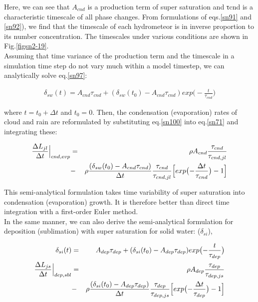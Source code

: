 Here, we can see that $A_{cnd}$ is a production term of super saturation and τcnd is a characteristic timescale of all phase changes. From formulations of eqs.\ref{sn91} and \ref{sn92}), we find that the timescale of each hydrometeor is in inverse proportion to its number concentration. The timescales under various conditions are shown in Fig.\ref{figsn2-19}.\\
Assuming that time variance of the production term and the timescale in a simulation time step do not vary much within a model timestep, we can analytically solve eq.\ref{sn97}:

\begin{eqnarray}
\delta_{sw}(t)=A_{cnd}\tau_{cnd}+(\delta_{sw}(t_{0})-A_{cnd}\tau_{cnd})exp\bigl(-\frac{t}{\tau_{cnd}}\bigr)\label{sn100}
\end{eqnarray}

where $t = t_{0} + \Delta t$ and $t_{0} = 0$. Then, the condensation (evaporation) rates of cloud and rain are reformulated by substituting eq.\ref{sn100} into eq.\ref{sn71} and integrating these:

\begin{eqnarray}
\frac{\Delta L_{jl}}{\Delta t}\Bigr|_{cnd,evp}&=&\rho A_{cnd}\frac{\tau_{cnd}}{\tau_{cnd,jl}}\nonumber\\
&-&\rho\frac{(\delta_{sw}(t_{0})-A_{cnd}\tau_{cnd})}{\Delta t}\frac{\tau_{cnd}}{\tau_{cnd,jl}}\Bigl[exp\bigl(-\frac{\Delta t}{\tau_{cnd}}\bigr)-1\Bigr]\label{sn101}
\end{eqnarray}

This semi-analytical formulation takes time variability of super saturation into condensation (evaporation) growth. It is therefore better than direct time integration with a first-order Euler method.\\
In the same manner, we can also derive the semi-analytical formulation for deposition (sublimation) with super saturation for solid water: ($\delta_{si}$),

\begin{eqnarray}
\delta_{si}(t)&=&A_{dep}\tau_{dep}+(\delta_{si}(t_{0})-A_{dep}\tau_{dep})exp\bigl(-\frac{t}{\tau_{dep}}\bigr)\label{sn103}\\
\frac{\Delta L_{js}}{\Delta t}\Bigr|_{dep,sbl}&=&\rho A_{dep}\frac{\tau_{dep}}{\tau_{dep,js}}\nonumber\\
&-&\rho\frac{(\delta_{si}(t_{0})-A_{dep}\tau_{dep})}{\Delta t}\frac{\tau_{dep}}{\tau_{dep,js}}\Bigl[exp\bigl(-\frac{\Delta t}{\tau_{dep}}\bigr)-1\Bigr]\label{sn104}
\end{eqnarray}

